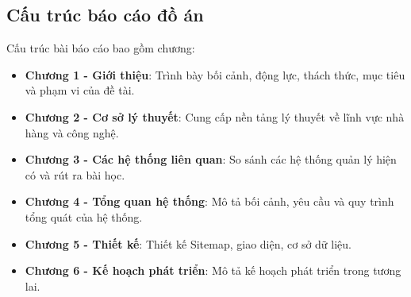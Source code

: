 \subsection{Cấu trúc báo cáo đồ án}
Cấu trúc bài báo cáo bao gồm  chương:
\begin{itemize}
    \item \textbf{Chương 1 - Giới thiệu}: Trình bày bối cảnh, động lực, thách thức, mục tiêu và phạm vi của đề tài.
    \item \textbf{Chương 2 - Cơ sở lý thuyết}: Cung cấp nền tảng lý thuyết về lĩnh vực nhà hàng và công nghệ.
    \item \textbf{Chương 3 - Các hệ thống liên quan}: So sánh các hệ thống quản lý hiện có và rút ra bài học.
    \item \textbf{Chương 4 - Tổng quan hệ thống}: Mô tả bối cảnh, yêu cầu và quy trình tổng quát của hệ thống.
    \item \textbf{Chương 5 - Thiết kế}: Thiết kế Sitemap, giao diện, cơ sở dữ liệu.
    \item \textbf{Chương 6 - Kế hoạch phát triển}: Mô tả kế hoạch phát triển trong tương lai.
\end{itemize}

